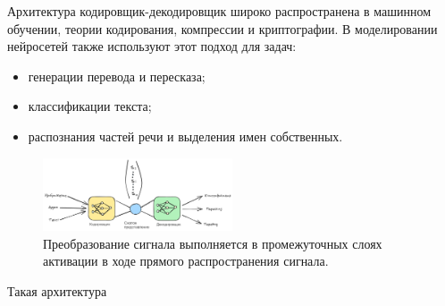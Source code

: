 Архитектура кодировщик-декодировщик широко распространена в машинном обучении, теории кодирования, компрессии и
криптографии. В моделировании нейросетей также используют этот подход для задач:
 \begin{itemize}
    \item генерации перевода и пересказа;
    \item классификации текста;
    \item распознания частей речи и выделения имен собственных.
\end{itemize}

\begin{figure}[h]
    \centering
    \includegraphics[width=0.5\textwidth]{assets/ml/nn/encoder_decoder.excalidraw.png}
    \caption{Преобразование сигнала выполняется в промежуточных слоях активации в ходе прямого распространения сигнала.}
    \label{encoder}
\end{figure}

Такая архитектура 

